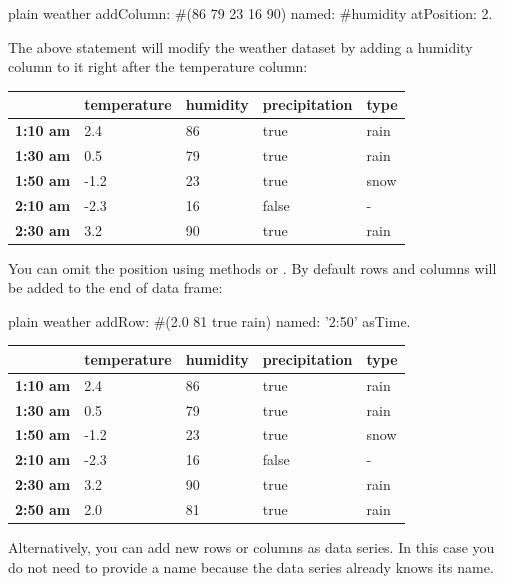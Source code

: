 \documentclass[10pt,twoside,english]{_support/latex/sbabook/sbabook}
\begin{document}
\begin{displaycode}{plain}
weather
  addColumn: #(86 79 23 16 90)
  named: #humidity
  atPosition: 2.
\end{displaycode}

The above statement will modify the weather dataset by adding a humidity column to it right after the temperature column:

\begin{tabular}{lllll}
\toprule
 & \textbf{temperature} & \textbf{humidity} & \textbf{precipitation} & \textbf{type} \\
\midrule
\textbf{1:10 am} & 2.4 & 86 & true & rain \\
\textbf{1:30 am} & 0.5 & 79 & true & rain \\
\textbf{1:50 am} & -1.2 & 23 & true & snow \\
\textbf{2:10 am} & -2.3 & 16 & false & - \\
\textbf{2:30 am} & 3.2 & 90 & true & rain \\
\bottomrule
\end{tabular}

You can omit the position using methods  or . By default rows and columns will be added to the end of data frame:

\begin{displaycode}{plain}
weather
  addRow: #(2.0 81 true rain)
  named: '2:50' asTime.
\end{displaycode}

\begin{tabular}{lllll}
\toprule
 & \textbf{temperature} & \textbf{humidity} & \textbf{precipitation} & \textbf{type} \\
\midrule
\textbf{1:10 am} & 2.4 & 86 & true & rain \\
\textbf{1:30 am} & 0.5 & 79 & true & rain \\
\textbf{1:50 am} & -1.2 & 23 & true & snow \\
\textbf{2:10 am} & -2.3 & 16 & false & - \\
\textbf{2:30 am} & 3.2 & 90 & true & rain \\
\textbf{2:50 am} & 2.0 & 81 & true & rain \\
\bottomrule
\end{tabular}

Alternatively, you can add new rows or columns as data series. In this case you do not need to provide a name because the data series already knows its name.
\end{document}
